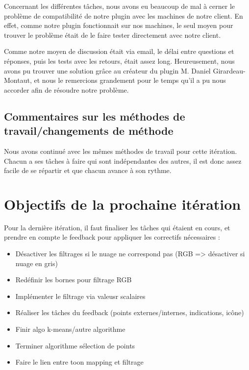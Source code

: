 \documentclass[12pt,titlepage,french]{article}
\begin{document}
Concernant les différentes tâches, nous avons eu beaucoup de mal à cerner le problème de compatibilité de notre plugin avec les machines de notre client. En effet, comme notre plugin fonctionnait sur nos machines, le seul moyen pour trouver le problème était de le faire tester directement avec notre client. \newline

Comme notre moyen de discussion était via email, le délai entre questions et réponses, puis les tests avec les retours, était assez long. Heureusement, nous avons pu trouver une solution grâce au créateur du plugin M. Daniel Girardeau-Montaut, et nous le remercions grandement pour le temps qu'il a pu nous accorder afin de résoudre notre problème.

\subsection{Commentaires sur les méthodes de travail/changements de méthode}

Nous avons continué avec les mêmes méthodes de travail pour cette itération. Chacun a ses tâches à faire qui sont indépendantes des autres, il est donc assez facile de se répartir et que chacun avance à son rythme.

\section{Objectifs de la prochaine itération}

Pour la dernière itération, il faut finaliser les tâches qui étaient en cours, et prendre en compte le feedback pour appliquer les correctifs nécessaires :

\begin{itemize}
    \item Désactiver les filtrages si le nuage ne correspond pas (RGB => désactiver si nuage en gris)
    \item Redéfinir les bornes pour filtrage RGB
    \item Implémenter le filtrage via valeusr scalaires
    \item Réaliser les tâches du feedback (points externes/internes, indications, icône)
    \item Finir algo k-means/autre algorithme
    \item Terminer algorithme sélection de points
    \item Faire le lien entre toon mapping et filtrage
\end{itemize}

\begin{thebibliography}{3}

\end{thebibliography}
\end{document}
